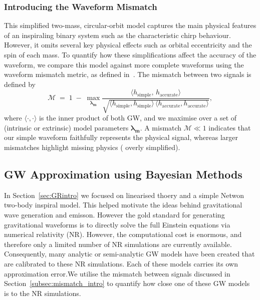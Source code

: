 \documentclass[12pt]{article}
\begin{document}
\subsubsection*{Introducing the Waveform Mismatch}
\label{subsec:mismatch_intro}
%
%
This simplified two-mass, circular-orbit model captures the main physical features of an inspiraling binary system such as the characteristic chirp behaviour. However, it omits several key physical effects such as orbital eccentricity and the spin of each mass. 
To quantify how these simplifications affect the accuracy of the waveform, we compare this model against more complete waveforms using the waveform mismatch metric, as defined in~\cite{mismatch, Ogpaper}.
%
%
The mismatch between two signals is defined by
\begin{equation}
\label{eq:mismatch_def}
\mathcal{M} 
\;=\; 
1 \;-\;
\max_{\mathbf{\lambda_m}}
\frac{\langle h_{\text{simple}},\,h_{\text{accurate}}\rangle}
{\sqrt{\langle h_{\text{simple}},h_{\text{simple}}\rangle \,
\langle h_{\text{accurate}},h_{\text{accurate}}\rangle}},
\end{equation}
where \(\langle\cdot,\cdot\rangle\) is the inner product of both GW, and we maximise over a set of (intrinsic or extrinsic) model parameters \(\mathbf{\lambda_m}\).
A mismatch \(\mathcal{M}\ll 1\) indicates that our simple waveform
faithfully represents the physical signal, whereas larger mismatches highlight missing
physics ( overly simplified).




\subsection{GW Approximation using Bayesian Methods}
\label{sec:GW_and_Bayes}

In Section~\ref{sec:GRintro} we focused on linearised thoery and a simple Netwon two-body inspiral model. This helped motivate the ideas behind gravitational wave generation and emisson.
However the gold standard for generating gravitational waveforms is to directly solve the full Einstein equations via numerical relativity (NR).
However, the computational cost is enormous, and therefore only a limited number of NR simulations are currently available.
Consequently, many analytic or semi-analytic GW models have been created that are calibrated to these NR simulations.
Each of these models carries its own approximation error.We utilise the mismatch between signals discussed in Section~\ref{subsec:mismatch_intro} 
to quantify how close one of these GW models is to the NR simulations.
\end{document}
